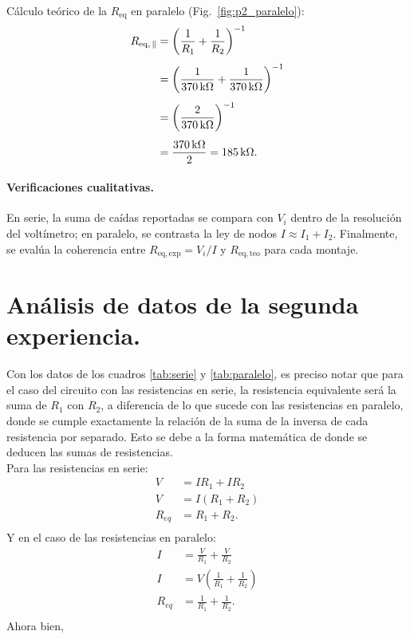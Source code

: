 \documentclass[11pt,twocolumn]{article}
\begin{document}
Cálculo teórico de la $R_{\mathrm{eq}}$ en paralelo (Fig.~\ref{fig:p2_paralelo}):
\begin{align}
R_{\mathrm{eq,\,\parallel}}
&= \left(\frac{1}{R_1}+\frac{1}{R_2}\right)^{-1} \label{eq:resistencia_equivalente_en_paralelo} \\[4pt]
&= \left(\frac{1}{370\,\mathrm{k}\Omega}+\frac{1}{370\,\mathrm{k}\Omega}\right)^{-1} \notag \\[4pt]
&= \left(\frac{2}{370\,\mathrm{k}\Omega}\right)^{-1} \notag\\[4pt]
&= \frac{370\,\mathrm{k}\Omega}{2}
   = 185\,\mathrm{k}\Omega. \notag
\end{align}

\paragraph{Verificaciones cualitativas.}
En serie, la suma de caídas reportadas se compara con $V_i$ dentro de la resolución del voltímetro; en paralelo, se contrasta la ley de nodos $I\approx I_1+I_2$. Finalmente, se evalúa la coherencia entre $R_{\mathrm{eq,exp}}=V_i/I$ y $R_{\mathrm{eq,teo}}$ para cada montaje.
  
\section{Análisis de datos de la segunda experiencia.}
            
Con los datos de los cuadros \ref{tab:serie} y \ref{tab:paralelo}, es preciso notar que para el caso del circuito con las resistencias en serie, la resistencia equivalente será la suma de $R_1$ con $R_2$, a diferencia de lo que sucede con las resistencias en paralelo, donde se cumple exactamente la relación de la suma de la inversa de cada resistencia por separado. Esto se debe a la forma matemática de donde se deducen las sumas de resistencias.\\
Para las resistencias en serie:
\begin{align*}
    V &= IR_1+IR_2\\
    V &= I(R_1 + R_2)\\
    R_{eq} &= R_1 + R_2.\\
\end{align*}
Y en el caso de las resistencias en paralelo:
\begin{align*}
    I &= \frac{V}{R_1} + \frac{V}{R_2}\\
    I &= V \left(\frac{1}{R_1} + \frac{1}{R_2}\right)\\
    R_{eq} &= \frac{1}{R_1} + \frac{1}{R_2}.\\
\end{align*}
Ahora bien, 
\end{document}
